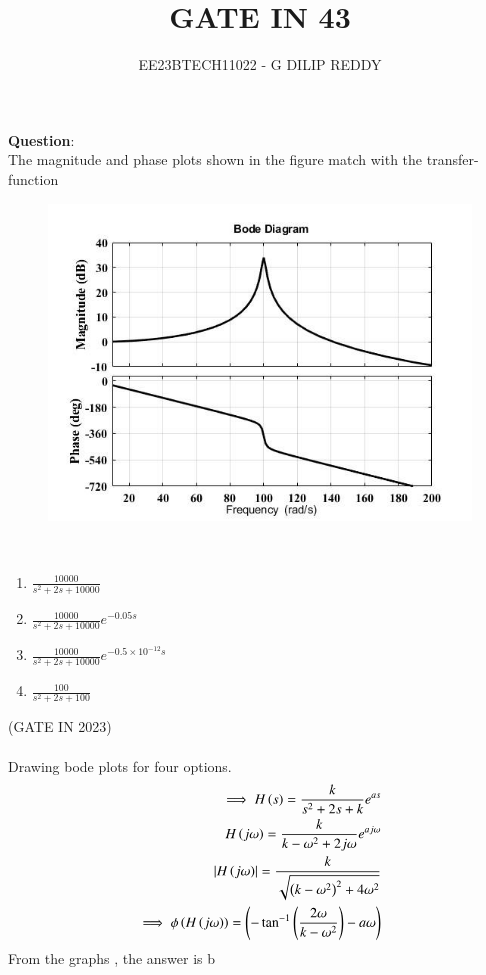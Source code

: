 \documentclass[journal,12pt,onecolumn]{IEEEtran}
\theoremstyle{remark}
\begin{document}

\vspace{3cm}

\title{GATE IN 43}
\author{EE23BTECH11022 - G DILIP REDDY}
\maketitle

\bigskip

\renewcommand{\thefigure}{\arabic{figure}}
\renewcommand{\thetable}{\arabic{table}}
\textbf{Question}:\\
The magnitude and phase plots shown in the figure match with the transfer-
function
\begin{figure}[h]
    \centering
    \includegraphics[width=\columnwidth]{2023/IN/43/figs/question.png}
\end{figure}\\
\renewcommand{\labelenumi}{\alph{enumi})}
\begin{enumerate}
\item $\frac{10000}{s^2+2s+10000}$\\
\item $\frac{10000}{s^2+2s+10000}e^{-0.05s}$\\
\item $\frac{10000}{s^2+2s+10000}e^{-0.5\times10^{-12}s}$\\
\item $\frac{100}{s^2+2s+100}$
\end{enumerate}
\hfill{(GATE IN 2023)}
\\\\
\solution
\fi
Drawing bode plots for four options.\\
\begin{align}
\implies H\left(s\right)=\frac{k}{s ^{2}+2s+k}e^{as}\\
H\left(j\omega\right)=\frac{k}{k-\omega ^2+2j\omega}e^{aj\omega}\\
\left\vert H\left(j\omega\right)\right\vert=\frac{k}{\sqrt{\left(k-\omega ^2\right)^2+4\omega^2}}\\
\implies \phi\left(H\left(j\omega\right)\right)=\left(-\tan^{-1}{\left(\frac{2\omega}{k-\omega^2}\right)-a\omega}\right)
\end{align}
From the graphs , the answer is b
\end{document}
